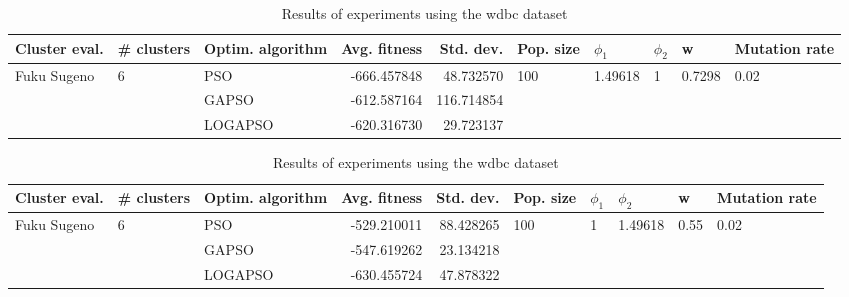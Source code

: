 \documentclass{article}
\begin{document}
\begin{table}
\centering
\caption{Results of experiments using the wdbc dataset}
\begin{tabular}{lllrrlllll}
\toprule
               Cluster eval. &        \# clusters & Optim. algorithm &  Avg. fitness &  Std. dev. &            Pop. size &               $\phi_{1}$ &         $\phi_{2}$ &                       w &         Mutation rate \\
\midrule
\multirow{3}{*}{Fuku Sugeno} & \multirow{3}{*}{6} &              PSO &   -666.457848 &  48.732570 & \multirow{3}{*}{100} & \multirow{3}{*}{1.49618} & \multirow{3}{*}{1} & \multirow{3}{*}{0.7298} & \multirow{3}{*}{0.02} \\
                             &                    &            GAPSO &   -612.587164 & 116.714854 &                      &                          &                    &                         &                       \\
                             &                    &          LOGAPSO &   -620.316730 &  29.723137 &                      &                          &                    &                         &                       \\
\bottomrule
\end{tabular}
\end{table}
\begin{table}
\centering
\caption{Results of experiments using the wdbc dataset}
\begin{tabular}{lllrrlllll}
\toprule
               Cluster eval. &        \# clusters & Optim. algorithm &  Avg. fitness &  Std. dev. &            Pop. size &         $\phi_{1}$ &               $\phi_{2}$ &                     w &         Mutation rate \\
\midrule
\multirow{3}{*}{Fuku Sugeno} & \multirow{3}{*}{6} &              PSO &   -529.210011 &  88.428265 & \multirow{3}{*}{100} & \multirow{3}{*}{1} & \multirow{3}{*}{1.49618} & \multirow{3}{*}{0.55} & \multirow{3}{*}{0.02} \\
                             &                    &            GAPSO &   -547.619262 &  23.134218 &                      &                    &                          &                       &                       \\
                             &                    &          LOGAPSO &   -630.455724 &  47.878322 &                      &                    &                          &                       &                       \\
\bottomrule
\end{tabular}
\end{table}
\end{document}
